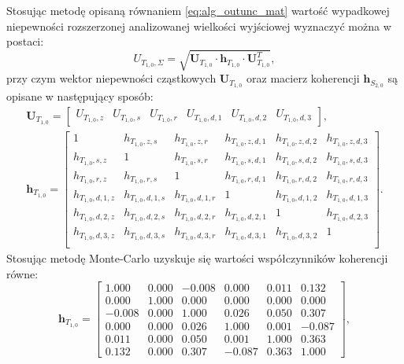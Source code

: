 Stosując metodę opisaną równaniem \eqref{eq:alg_outunc_mat} wartość wypadkowej niepewności rozszerzonej analizowanej wielkości wyjściowej wyznaczyć można w postaci:
\begin{equation}
U_{T_{1,0},\Sigma} = \sqrt{\mathbf{U}_{T_{1,0}} \cdot \mathbf{h}_{T_{1,0}} \cdot \mathbf{U}_{T_{1,0}}^{T}} \label{eq:sym_partd_output_unc_summul_T_1_0},
\end{equation}
przy czym wektor niepewności cząstkowych $\mathbf{U}_{T_{1,0}}$ oraz macierz koherencji $\mathbf{h}_{S_{2,0}}$ są opisane w następujący sposób:
\begin{gather}
\mathbf{U}_{T_{1,0}} =
\begin{bmatrix}
U_{T_{1,0},z} & U_{T_{1,0},s} & U_{T_{1,0},r} & U_{T_{1,0},d,1} & U_{T_{1,0},d,2} & U_{T_{1,0},d,3}
\end{bmatrix}
\label{eq:sym_partd_output_unc_sumuvect_T_1_0}, \\
\mathbf{h}_{T_{1,0}} =
\begin{bmatrix}
1                 & h_{T_{1,0},z,s}   & h_{T_{1,0},z,r}   & h_{T_{1,0},z,d,1} & h_{T_{1,0},z,d,2} & h_{T_{1,0},z,d,3} \\
h_{T_{1,0},s,z}   & 1                 & h_{T_{1,0},s,r}   & h_{T_{1,0},s,d,1} & h_{T_{1,0},s,d,2} & h_{T_{1,0},s,d,3} \\
h_{T_{1,0},r,z}   & h_{T_{1,0},r,s}   & 1                 & h_{T_{1,0},r,d,1} & h_{T_{1,0},r,d,2} & h_{T_{1,0},r,d,3} \\
h_{T_{1,0},d,1,z} & h_{T_{1,0},d,1,s} & h_{T_{1,0},d,1,r} & 1                 & h_{T_{1,0},d,1,2} & h_{T_{1,0},d,1,3} \\
h_{T_{1,0},d,2,z} & h_{T_{1,0},d,2,s} & h_{T_{1,0},d,2,r} & h_{T_{1,0},d,2,1} & 1                 & h_{T_{1,0},d,2,3} \\
h_{T_{1,0},d,3,z} & h_{T_{1,0},d,3,s} & h_{T_{1,0},d,3,r} & h_{T_{1,0},d,3,1} & h_{T_{1,0},d,3,2} & 1                 \\
\end{bmatrix}
\label{eq:sym_partd_output_unc_sumcoher_T_1_0}.
\end{gather}
Stosując metodę Monte-Carlo uzyskuje się wartości współczynników koherencji równe:
\begin{equation}
\mathbf{h}_{T_{1,0}} =
\begin{bmatrix}
1.000  & 0.000 & -0.008 & 0.000  & 0.011 & 0.132  \\
0.000  & 1.000 & 0.000  & 0.000  & 0.000 & 0.000  \\
-0.008 & 0.000 & 1.000  & 0.026  & 0.050 & 0.307  \\
0.000  & 0.000 & 0.026  & 1.000  & 0.001 & -0.087 \\
0.011  & 0.000 & 0.050  & 0.001  & 1.000 & 0.363  \\
0.132  & 0.000 & 0.307  & -0.087 & 0.363 & 1.000
\end{bmatrix}
\label{eq:sym_partd_output_unc_sumcoherval_T_1_0},
\end{equation}
